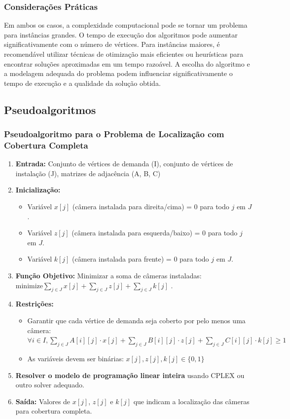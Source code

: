 \documentclass[12pt, a4paper]{report}
\begin{document}
\subsubsection{Considerações Práticas}
Em ambos os casos, a complexidade computacional pode se tornar um problema para instâncias grandes. O tempo de execução dos algoritmos pode aumentar significativamente com o número de vértices. Para instâncias maiores, é recomendável utilizar técnicas de otimização mais eficientes ou heurísticas para encontrar soluções aproximadas em um tempo razoável. A escolha do algoritmo e a modelagem adequada do problema podem influenciar significativamente o tempo de execução e a qualidade da solução obtida.

\subsection{Pseudoalgoritmos}

\subsubsection{Pseudoalgoritmo para o Problema de Localização com Cobertura Completa}
\begin{enumerate}
    \item \textbf{Entrada:} Conjunto de vértices de demanda (I), conjunto de vértices de instalação (J), matrizes de adjacência (A, B, C)
    \item \textbf{Inicialização:}
    \begin{itemize}
        \item Variável \(x[j]\) (câmera instalada para direita/cima) = 0 para todo \(j\) em \(J\).
        \item Variável \(z[j]\) (câmera instalada para esquerda/baixo) = 0 para todo \(j\) em \(J\).
        \item Variável \(k[j]\) (câmera instalada para frente) = 0 para todo \(j\) em \(J\).
    \end{itemize}
    \item \textbf{Função Objetivo:} Minimizar a soma de câmeras instaladas: \(\text{minimize} \sum_{j \in J} x[j] + \sum_{j \in J} z[j] + \sum_{j \in J} k[j]\) \cite{veloso2021localizacao}.
    \item \textbf{Restrições:}
    \begin{itemize}
        \item Garantir que cada vértice de demanda seja coberto por pelo menos uma câmera: \(\forall i \in I, \sum_{j \in J} A[i][j] \cdot x[j] + \sum_{j \in J} B[i][j] \cdot z[j] + \sum_{j \in J} C[i][j] \cdot k[j] \geq 1\)
        \item As variáveis devem ser binárias: \(x[j], z[j], k[j] \in \{0, 1\}\)
    \end{itemize}
    \item \textbf{Resolver o modelo de programação linear inteira} usando CPLEX ou outro solver adequado.
    \item \textbf{Saída:} Valores de \(x[j]\), \(z[j]\) e \(k[j]\) que indicam a localização das câmeras para cobertura completa.
\end{enumerate}
\end{document}
